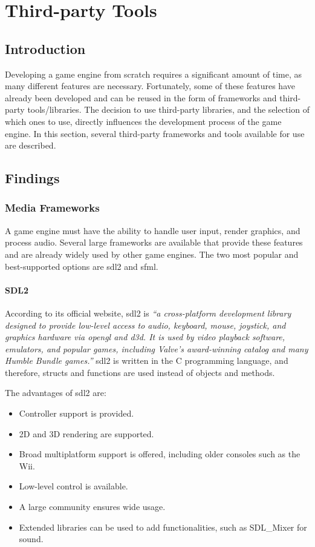 \documentclass{projdoc}
\begin{document}
\section{Third-party Tools}

\subsection{Introduction}

Developing a game engine from scratch requires a significant amount of time, as many
different features are necessary. Fortunately, some of these features have already
been developed and can be reused in the form of frameworks and third-party
tools/libraries. The decision to use third-party libraries, and the selection of
which ones to use, directly influences the development process of the game engine. In
this section, several third-party frameworks and tools available for use are
described.

\subsection{Findings}

\subsubsection{Media Frameworks}

A game engine must have the ability to handle user input, render graphics, and
process audio. Several large frameworks are available that provide these features and
are already widely used by other game engines. The two most popular and
best-supported options are \gls{sdl2} and \gls{sfml}.

\paragraph{SDL2}

According to its official website, \gls{sdl2} is \emph{``a cross-platform development
library designed to provide low-level access to audio, keyboard, mouse, joystick, and
graphics hardware via \gls{opengl} and \gls{d3d}. It is used by video playback
software, emulators, and popular games, including Valve's award-winning catalog and
many Humble Bundle games.''} \gls{sdl2} is written in the C programming language, and
therefore, structs and functions are used instead of objects and methods.

The advantages of \gls{sdl2} are:\noparbreak
\begin{itemize}
	\item Controller support is provided.
	\item 2D and 3D rendering are supported.
	\item Broad multiplatform support is offered, including older consoles such as the
		Wii.
	\item Low-level control is available.
	\item A large community ensures wide usage.
	\item Extended libraries can be used to add functionalities, such as SDL\_Mixer for
		sound.
\end{itemize}
\end{document}
